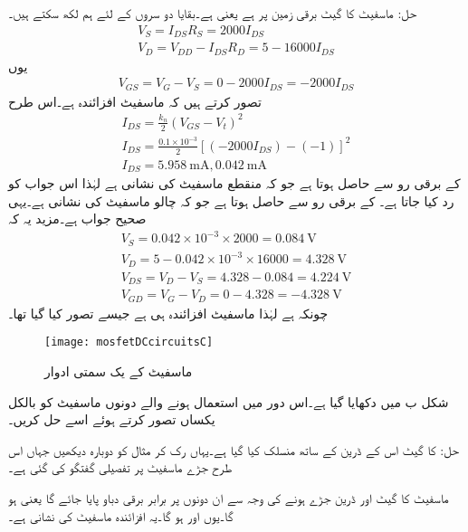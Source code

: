 حل:	ماسفیٹ کا گیٹ برقی زمین پر ہے یعنی  ہے۔بقایا دو سروں کے لئے ہم لکھ سکتے ہیں۔
\begin{align*}
V_S=I_{DS}R_S =2000I_{DS}\\
V_D=V_{DD}-I_{DS}R_D=5-16000 I_{DS}
\end{align*}
یوں
\begin{align*}
V_{GS}=V_G-V_S=0-2000I_{DS}=-2000I_{DS}
\end{align*}
تصور کرتے ہیں کہ ماسفیٹ افزائندہ ہے۔اس طرح
\begin{align*}
I_{DS}=\frac{k_n}{2}\left(V_{GS}-V_t \right )^2 \\
I_{DS}=\frac{0.1 \times 10^{-3}}{2} \left[\left(-2000I_{DS} \right )-(-1) \right ]^2 \\
I_{DS}=\SI{5.958}{\milli \ampere}, \SI{0.042}{\milli \ampere}
\end{align*}
  کے برقی رو سے   حاصل ہوتا ہے جو کہ منقطع ماسفیٹ کی نشانی ہے لہٰذا اس جواب کو رد کیا جاتا ہے۔  کے برقی رو سے  حاصل ہوتا ہے جو کہ چالو ماسفیٹ کی نشانی ہے۔یہی صحیح جواب ہے۔مزید یہ کہ
\begin{align*}
V_S=0.042 \times 10^{-3} \times 2000=\SI{0.084}{\volt}\\
V_D=5-0.042 \times 10^{-3} \times 16000=\SI{4.328}{\volt}\\
V_{DS}=V_D-V_S=4.328-0.084=\SI{4.224}{ \volt}\\
V_{GD}=V_G-V_D=0-4.328=\SI{-4.328}{\volt}
\end{align*}
چونکہ   ہے لہٰذا ماسفیٹ افزائندہ ہی ہے جیسے تصور کیا گیا تھا۔
\begin{figure}
\centering
\texttt{[image: mosfetDCcircuitsC]}
\caption{ماسفیٹ کے یک سمتی ادوار}
\label{شکل_ماسفیٹ_کے_یک_سمتی_ادوار_پ}
\end{figure}

شکل  ب میں   دکھایا گیا ہے۔اس دور میں استعمال ہونے والے دونوں ماسفیٹ کو بالکل یکساں تصور کرتے ہوئے اسے حل کریں۔

حل:  کا گیٹ اس کے ڈرین کے ساتھ منسلک کیا گیا ہے۔یہاں رک کر مثال   کو دوبارہ دیکھیں جہاں اس طرح جڑے ماسفیٹ پر تفصیلی گفتگو کی گئی ہے۔

ماسفیٹ کا گیٹ اور ڈرین جڑے ہونے کی وجہ سے ان دونوں پر برابر برقی دباو پایا جائے گا یعنی  ہو گا۔یوں  اور   ہو گا۔یہ افزائندہ ماسفیٹ کی نشانی ہے۔


